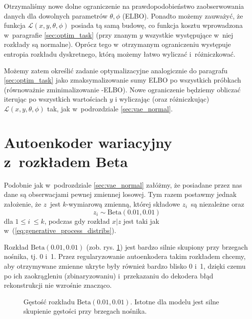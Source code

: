 \documentclass{iithesis}
\begin{document}
Otrzymaliśmy nowe dolne ograniczenie na prawdopodobieństwo zaobserwowania danych dla
dowolnych parametrów $\theta,\phi$ (ELBO). Ponadto możemy zauważyć, że funkcja $\mathcal{L}(x,y,\theta,\phi)$
posiada tą samą budowę, co funkcja kosztu wprowadzona w~paragrafie \ref{sec:optim_task} (przy znanym
$y$ wszystkie występujące w~niej rozkłady są normalne). Oprócz tego w~otrzymanym ograniczeniu występuje
entropia rozkładu dyskretnego, którą możemy łatwo wyliczać i~różniczkować.

Możemy zatem określić zadanie optymalizacyjne analogicznie do paragrafu \ref{sec:optim_task}
jako zmaksymalizowanie sumy ELBO po wszystkich próbkach (równoważnie zminimalizowanie -ELBO).
Nowe ograniczenie będziemy obliczać iterując po wszystkich wartościach $y$ i
wyliczając (oraz różniczkując) $\mathcal{L}(x,y,\theta,\phi)$ tak, jak w~podrozdziale \ref{sec:vae_normal}.

\section{Autoenkoder wariacyjny z~rozkładem Beta} \label{sec:vae_beta}
Podobnie jak w~podrozdziale \ref{sec:vae_normal} załóżmy, że posiadane przez nas dane
są obserwacjami pewnej zmiennej losowej. Tym razem postawmy jednak założenie, że
$z$~jest $k$-wymiarową zmienną, której składowe $z_i$~są niezależne oraz
$$
z_i \sim \text{Beta}(0.01, 0.01)
$$
dla $1 \leq i~\leq k$, podczas gdy rozkład $x|z$ jest taki jak w~(\ref{eq:generative_process_distribs}).

Rozkład $\text{Beta}(0.01, 0.01)$ (zob. rys. \ref{fig:beta_distrib}) jest bardzo silnie
skupiony przy brzegach nośnika, tj. 0 i~1. Przez regularyzowanie autoenkodera takim rozkładem
chcemy, aby otrzymywane zmienne ukryte były również bardzo blisko 0 i~1, dzięki czemu
po ich zaokrągleniu (zbinaryzowaniu) i~przekazaniu do dekodera błąd rekonstrukcji nie wzrośnie znacząco.

\begin{figure}
    \caption{\label{fig:beta_distrib} Gęstość rozkładu $\text{Beta}(0.01, 0.01)$.
    Istotne dla modelu jest silne skupienie gęstości przy brzegach nośnika.}
\end{figure}
\end{document}
